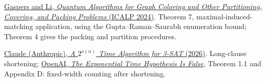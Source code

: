 \documentclass[11pt,a4paper]{article}
\theoremstyle{problemstyle}
\newenvironment{algorithmindex}[1]{%
  \begin{enumerate}[label={[#1.\arabic*]},leftmargin=3.4em,labelsep=0.6em,itemsep=4pt,topsep=3pt,parsep=0pt]
  \small
}{\end{enumerate}}
\begin{document}
\begin{algorithmindex}{25}
\item \href{https://arxiv.org/pdf/2311.08042}{Gaspers and Li, \emph{Quantum Algorithms for Graph Coloring and Other Partitioning, Covering, and Packing Problems} (ICALP 2024)}. Theorem 7, maximal-induced-matching application, using the Gupta--Raman--Saurabh enumeration bound; Theorem 4 gives the packing and partition procedures.
\item \href{https://github.com/anthropics/formal-math/tree/main/eth}{Claude (Anthropic), \emph{A $2^{o(n)}$ Time Algorithm for 3-SAT} (2026)}. Long-clause shortening; \href{https://github.com/openai/math/blob/main/preprints/The-Exponential-Time-Hypothesis-is-False-October-25-2026/paper.pdf}{OpenAI, \emph{The Exponential Time Hypothesis Is False}}, Theorem 1.1 and Appendix D: fixed-width counting after shortening.
\end{algorithmindex}
\end{document}
